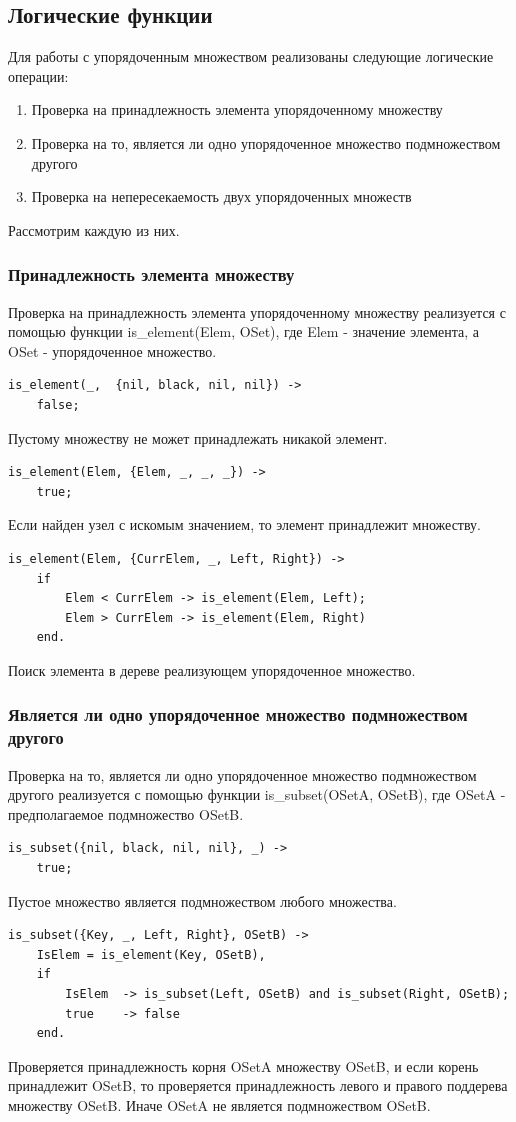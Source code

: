 			
	\subsection{Логические функции}
		Для работы с упорядоченным множеством реализованы следующие логические операции:
		\begin{enumerate}
			\item Проверка на принадлежность элемента упорядоченному множеству
			\item Проверка на то, является ли одно упорядоченное множество
				  подмножеством другого
			\item Проверка на непересекаемость двух упорядоченных множеств
		\end{enumerate} 
		Рассмотрим каждую из них.
		
		\subsubsection{Принадлежность элемента множеству}
			Проверка на принадлежность элемента упорядоченному множеству
			реализуется с помощью функции is\_element(Elem, OSet), где Elem - 
			значение элемента, а OSet - упорядоченное множество.
			\begin{lstlisting}
is_element(_,  {nil, black, nil, nil}) ->
	false;				
			\end{lstlisting}
			Пустому множеству не может принадлежать никакой элемент.
			\begin{lstlisting}
is_element(Elem, {Elem, _, _, _}) ->
	true;
			\end{lstlisting}
			Если найден узел с искомым значением, то элемент принадлежит множеству.
			\begin{lstlisting}
is_element(Elem, {CurrElem, _, Left, Right}) ->		
	if
		Elem < CurrElem -> is_element(Elem, Left);
		Elem > CurrElem -> is_element(Elem, Right)
	end.	
			\end{lstlisting}
			Поиск элемента в дереве реализующем упорядоченное множество.
			
		\subsubsection{Является ли одно упорядоченное множество подмножеством другого}
			Проверка на то, является ли одно упорядоченное множество подмножеством другого
			реализуется с помощью функции is\_subset(OSetA, OSetB), где OSetA - предполагаемое
			подмножество OSetB.
			\begin{lstlisting}
is_subset({nil, black, nil, nil}, _) ->
	true;	
			\end{lstlisting}
			Пустое множество является подмножеством любого множества.	
			\begin{lstlisting}
is_subset({Key, _, Left, Right}, OSetB) ->
	IsElem = is_element(Key, OSetB),
	if
		IsElem  -> is_subset(Left, OSetB) and is_subset(Right, OSetB);
		true 	-> false
	end.
			\end{lstlisting}
			Проверяется принадлежность корня OSetA множеству OSetB, и если корень
			принадлежит OSetB, то проверяется принадлежность левого и правого поддерева
			множеству OSetB. Иначе OSetA не является подмножеством OSetB.
			
